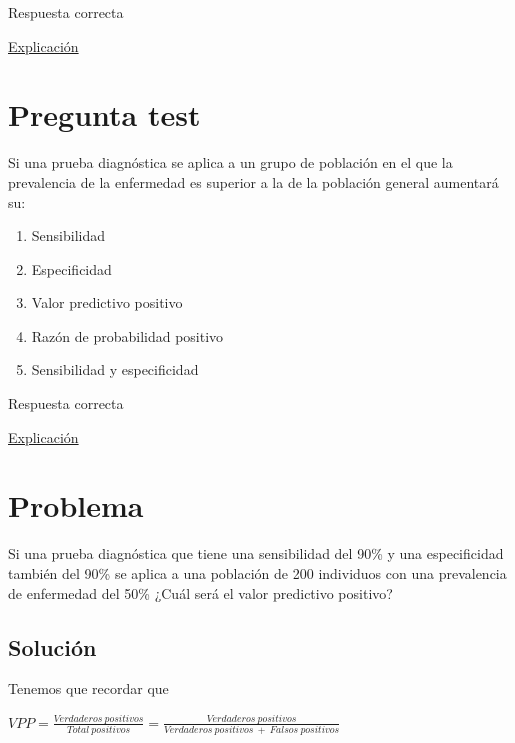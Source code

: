 \documentclass[
]{book}
\providecommand{\tightlist}{%
  \setlength{\itemsep}{0pt}\setlength{\parskip}{0pt}}
\begin{document}
Respuesta correcta

\href{https://1fjmanzano.github.io/bioestadistica/relaci\%C3\%B3n-entre-variables-cualitativas.html\#diagno\%CC\%81stico-cli\%CC\%81nico}{Explicación}

\hypertarget{pregunta-test-156}{%
\section{Pregunta test}\label{pregunta-test-156}}

Si una prueba diagnóstica se aplica a un grupo de población en el que la prevalencia de la enfermedad es superior a la de la población general aumentará su:

\begin{enumerate}
\def\labelenumi{\alph{enumi})}
\tightlist
\item
  Sensibilidad
\item
  Especificidad
\item
  Valor predictivo positivo
\item
  Razón de probabilidad positivo
\item
  Sensibilidad y especificidad
\end{enumerate}

Respuesta correcta

\href{https://1fjmanzano.github.io/bioestadistica/relaci\%C3\%B3n-entre-variables-cualitativas.html\#diagno\%CC\%81stico-cli\%CC\%81nico}{Explicación}

\hypertarget{problema-14}{%
\section{Problema}\label{problema-14}}

Si una prueba diagnóstica que tiene una sensibilidad del 90\% y una especificidad también del 90\% se aplica a una población de 200 individuos con una prevalencia de enfermedad del 50\% ¿Cuál será el valor predictivo positivo?

\hypertarget{soluciuxf3n-11}{%
\subsection{Solución}\label{soluciuxf3n-11}}

Tenemos que recordar que

\(VPP=\frac{Verdaderos ~ positivos}{Total ~ positivos}=\frac{Verdaderos ~ positivos}{Verdaderos ~ positivos ~ + ~ Falsos ~ positivos}\)
\end{document}
